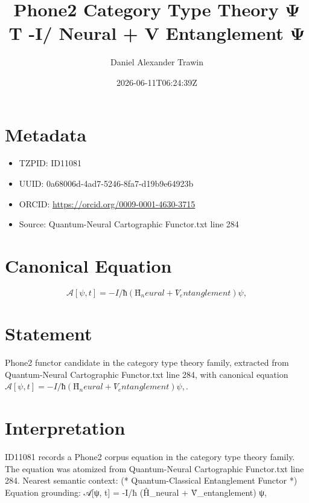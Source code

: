 \documentclass[11pt]{article}
\title{Phone2 Category Type Theory Ψ T -I/ Neural + V Entanglement Ψ}
\author{Daniel Alexander Trawin}
\date{2026-06-11T06:24:39Z}
\begin{document}
\maketitle
\section*{Metadata}
\begin{itemize}
\item TZPID: ID11081
\item UUID: 0a68006d-4ad7-5246-8fa7-d19b9e64923b
\item ORCID: \url{https://orcid.org/0009-0001-4630-3715}
\item Source: Quantum-Neural Cartographic Functor.txt line 284
\end{itemize}
\section*{Canonical Equation}
\[
𝒜[ψ, t] = -I/ħ (Ĥ_neural + V̂_entanglement) ψ,
\]
\section*{Statement}
Phone2 functor candidate in the category type theory family, extracted from Quantum-Neural Cartographic Functor.txt line 284, with canonical equation $𝒜[ψ, t] = -I/ħ (Ĥ_neural + V̂_entanglement) ψ,$.
\section*{Interpretation}
ID11081 records a Phone2 corpus equation in the category type theory family. The equation was atomized from Quantum-Neural Cartographic Functor.txt line 284. Nearest semantic context: (* Quantum-Classical Entanglement Functor *) Equation grounding: 𝒜[ψ, t] = -I/ħ (Ĥ_neural + V̂_entanglement) ψ,
\end{document}
